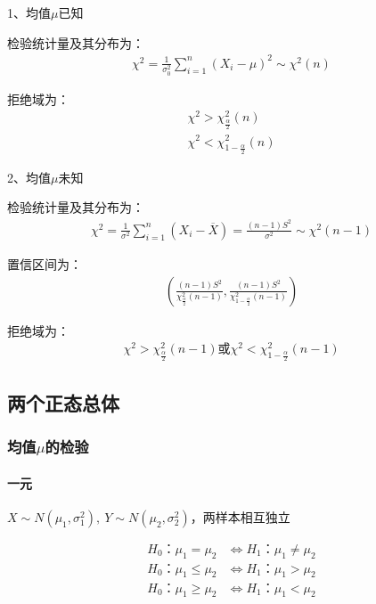 \documentclass[12pt]{book}
\begin{document}
1、均值$\mu$已知

检验统计量及其分布为：
\begin{gather*}
    \chi^2=\frac{1}{\sigma_0^2}\sum_{i=1}^{n}{(X_i-\mu)^2}\sim \chi^2(n)
\end{gather*}


拒绝域为：
\begin{gather*}
    \chi^2>\chi_{\frac{\alpha}{2}}^{2}(n)\\
    \chi^2<\chi_{1-\frac{\alpha}{2}}^{2}(n)
\end{gather*}


2、均值$\mu$未知

检验统计量及其分布为：
\begin{gather*}
    \chi^2=\frac{1}{\sigma^2}\sum_{i=1}^{n}{ \left(X_i- \overline{X}\right) } =\frac{(n-1)S^2}{\sigma^2} \sim \chi^2(n-1)
\end{gather*}


置信区间为：
\begin{gather*}
    \left( \frac{(n-1)S^2}{\chi_{\frac{\alpha}{2}}^{2} (n-1)}, \frac{(n-1)S^2}{\chi_{1-\frac{\alpha}{2}}^{2} (n-1)} \right)
\end{gather*}


拒绝域为：
\begin{gather*}
    \chi^2>\chi_{\frac{\alpha}{2}}^2(n-1) 或 χ^2<χ_{1-\frac{\alpha}{2}}^2(n-1)
\end{gather*}













\subsection{两个正态总体}





\subsubsection{均值$\mu$的检验}

\paragraph{一元}
$X\sim N\left(\mu_1,\sigma_1^2\right),\ Y\sim N\left(\mu_2,\sigma_2^2\right)$，两样本相互独立

\begin{align*}
    H_0：\mu_1=\mu_2    & \Leftrightarrow H_1：\mu_1\neq\mu_2 \\
    H_0：\mu_1\le\mu_2  & \Leftrightarrow H_1：\mu_1>\mu_2    \\
    H_0：\mu_1\geq\mu_2 & \Leftrightarrow H_1：\mu_1<\mu_2
\end{align*}
\end{document}
